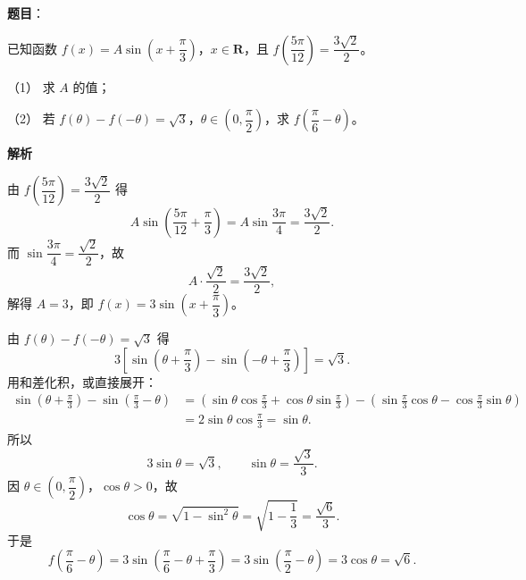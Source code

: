 \begin{answer}

\textbf{题目}：

已知函数 $f(x)=A\sin\left(x+\dfrac\pi3\right)$，$x\in\mathbf R$，且 $f\left(\dfrac{5\pi}{12}\right)=\dfrac{3\sqrt2}{2}$。

（1） 求 $A$ 的值；

（2） 若 $f(\theta)-f(-\theta)=\sqrt3$，$\theta\in\left(0,\dfrac\pi2\right)$，求 $f\left(\dfrac\pi6-\theta\right)$。

\textbf{解析}


由 $f\left(\dfrac{5\pi}{12}\right)=\dfrac{3\sqrt2}{2}$ 得
\nopagebreak[4]
\[A\sin\left(\frac{5\pi}{12}+\frac\pi3\right)=A\sin\frac{3\pi}{4}=\frac{3\sqrt2}{2}.\]
而 $\sin\dfrac{3\pi}{4}=\dfrac{\sqrt2}{2}$，故
\nopagebreak[4]
\[A\cdot\frac{\sqrt2}{2}=\frac{3\sqrt2}{2},\]
解得 $A=3$，即 $f(x)=3\sin\left(x+\dfrac\pi3\right)$。


由 $f(\theta)-f(-\theta)=\sqrt3$ 得
\nopagebreak[4]
\[3\left[\sin\left(\theta+\frac\pi3\right)-\sin\left(-\theta+\frac\pi3\right)\right]=\sqrt3 .\]
用和差化积，或直接展开：
\nopagebreak[4]
\[\begin{aligned}
\sin\left(\theta+\frac\pi3\right)-\sin\left(\frac\pi3-\theta\right)
&=\left(\sin\theta\cos\frac\pi3+\cos\theta\sin\frac\pi3\right)
-\left(\sin\frac\pi3\cos\theta-\cos\frac\pi3\sin\theta\right)\\
&=2\sin\theta\cos\frac\pi3=\sin\theta .
\end{aligned}\]
所以
\nopagebreak[4]
\[3\sin\theta=\sqrt3,\qquad \sin\theta=\frac{\sqrt3}{3}.\]
因 $\theta\in\left(0,\dfrac\pi2\right)$，$\cos\theta>0$，故
\nopagebreak[4]
\[\cos\theta=\sqrt{1-\sin^2\theta}=\sqrt{1-\frac13}=\frac{\sqrt6}{3}.\]
于是
\nopagebreak[4]
\[f\left(\frac\pi6-\theta\right)=3\sin\left(\frac\pi6-\theta+\frac\pi3\right)
=3\sin\left(\frac\pi2-\theta\right)=3\cos\theta=\sqrt6 .\]



\end{answer}
